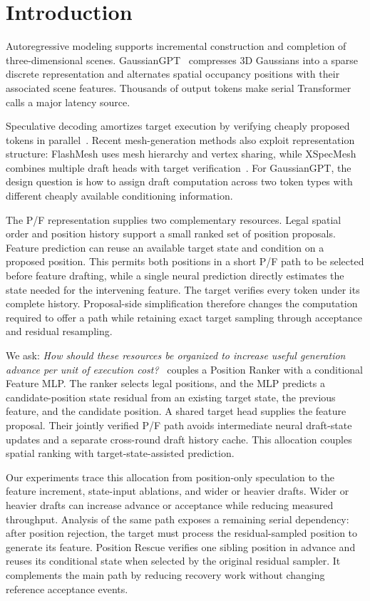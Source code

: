 \section{Introduction}
\label{sec:intro}
Autoregressive modeling supports incremental construction and completion of three-dimensional scenes. GaussianGPT~\cite{gaussiangpt} compresses 3D Gaussians into a sparse discrete representation and alternates spatial occupancy positions with their associated scene features. Thousands of output tokens make serial Transformer calls a major latency source.

Speculative decoding amortizes target execution by verifying cheaply proposed tokens in parallel~\cite{leviathan}. Recent mesh-generation methods also exploit representation structure: FlashMesh uses mesh hierarchy and vertex sharing, while XSpecMesh combines multiple draft heads with target verification~\cite{flashmesh,xspecmesh}. For GaussianGPT, the design question is how to assign draft computation across two token types with different cheaply available conditioning information.

The P/F representation supplies two complementary resources. Legal spatial order and position history support a small ranked set of position proposals. Feature prediction can reuse an available target state and condition on a proposed position. This permits both positions in a short P/F path to be selected before feature drafting, while a single neural prediction directly estimates the state needed for the intervening feature. The target verifies every token under its complete history. Proposal-side simplification therefore changes the computation required to offer a path while retaining exact target sampling through acceptance and residual resampling.

We ask: \emph{How should these resources be organized to increase useful generation advance per unit of execution cost?} \PF\ couples a Position Ranker with a conditional Feature MLP. The ranker selects legal positions, and the MLP predicts a candidate-position state residual from an existing target state, the previous feature, and the candidate position. A shared target head supplies the feature proposal. Their jointly verified P/F path avoids intermediate neural draft-state updates and a separate cross-round draft history cache. This allocation couples spatial ranking with target-state-assisted prediction.

Our experiments trace this allocation from position-only speculation to the feature increment, state-input ablations, and wider or heavier drafts. Wider or heavier drafts can increase advance or acceptance while reducing measured throughput. Analysis of the same path exposes a remaining serial dependency: after position rejection, the target must process the residual-sampled position to generate its feature. Position Rescue verifies one sibling position in advance and reuses its conditional state when selected by the original residual sampler. It complements the main path by reducing recovery work without changing reference acceptance events.

